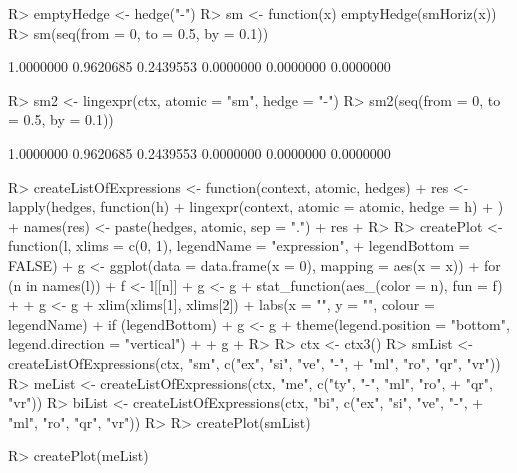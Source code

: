 \documentclass{article}\usepackage[]{graphicx}\usepackage[]{color}
\begin{document}
\begin{Schunk}
% --begin: "emptyhedge1"
\begin{Sinput}
R> emptyHedge <- hedge("-")
R> sm <- function(x) emptyHedge(smHoriz(x))
R> sm(seq(from = 0, to = 0.5, by = 0.1))
\end{Sinput}
\begin{Soutput}
[1] 1.0000000 0.9620685 0.2439553 0.0000000 0.0000000 0.0000000
\end{Soutput}
%
% --end: "emptyhedge1"
\end{Schunk}

\begin{Schunk}
% --begin: "emptyhedge2"
\begin{Sinput}
R> sm2 <- lingexpr(ctx, atomic = "sm", hedge = "-")
R> sm2(seq(from = 0, to = 0.5, by = 0.1))
\end{Sinput}
\begin{Soutput}
[1] 1.0000000 0.9620685 0.2439553 0.0000000 0.0000000 0.0000000
\end{Soutput}
%
% --end: "emptyhedge2"
\end{Schunk}

\begin{Schunk}
\begin{Sinput}
R> createListOfExpressions <- function(context, atomic, hedges) {
+      res <- lapply(hedges, function(h) {
+          lingexpr(context, atomic = atomic, hedge = h)
+      })
+      names(res) <- paste(hedges, atomic, sep = ".")
+      res
+  }
R> 
R> createPlot <- function(l, xlims = c(0, 1), legendName = "expression", 
+      legendBottom = FALSE) {
+      g <- ggplot(data = data.frame(x = 0), mapping = aes(x = x))
+      for (n in names(l)) {
+          f <- l[[n]]
+          g <- g + stat_function(aes_(color = n), fun = f)
+      }
+      g <- g + xlim(xlims[1], xlims[2]) + labs(x = "", y = "", colour = legendName)
+      if (legendBottom) {
+          g <- g + theme(legend.position = "bottom", legend.direction = "vertical")
+      }
+      g
+  }
R> 
R> ctx <- ctx3()
R> smList <- createListOfExpressions(ctx, "sm", c("ex", "si", "ve", "-", 
+      "ml", "ro", "qr", "vr"))
R> meList <- createListOfExpressions(ctx, "me", c("ty", "-", "ml", "ro", 
+      "qr", "vr"))
R> biList <- createListOfExpressions(ctx, "bi", c("ex", "si", "ve", "-", 
+      "ml", "ro", "qr", "vr"))
R> 
R> createPlot(smList)
\end{Sinput}
\end{Schunk}

\begin{Schunk}
\begin{Sinput}
R> createPlot(meList)
\end{Sinput}
\end{Schunk}
\end{document}
